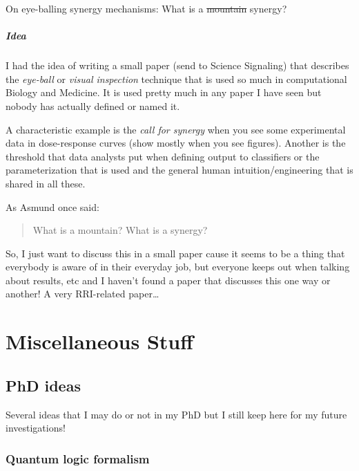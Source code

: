 \documentclass[12pt,]{book}
\begin{document}
On eye-balling synergy mechanisms: What is a \sout{mountain} synergy?

\hypertarget{idea-3}{%
\subsubsection*{Idea}\label{idea-3}}

I had the idea of writing a small paper (send to Science Signaling) that describes the \emph{eye-ball} or
\emph{visual inspection} technique that is used so much in computational Biology and
Medicine. It is used pretty much in any paper I have seen but nobody has actually
defined or named it.

A characteristic example is the \emph{call for synergy} when you see some
experimental data in dose-response curves (show mostly when you see figures). Another is the threshold that data analysts put when defining output to classifiers or the parameterization that is used and the general human intuition/engineering that is shared in all these.

As Asmund once said:

\begin{quote}
What is a mountain? What is a synergy?
\end{quote}

So, I just want to discuss this in a small paper cause it seems to be a
thing that everybody is aware of in their everyday job, but everyone keeps out
when talking about results, etc and I haven't found a paper that discusses this
one way or another!
A very RRI-related paper\ldots{}

\hypertarget{part-miscellaneous-stuff}{%
\part*{Miscellaneous Stuff}\label{part-miscellaneous-stuff}}

\hypertarget{ideas}{%
\chapter{PhD ideas}\label{ideas}}

Several ideas that I may do or not in my PhD but I still keep here for my future
investigations!

\hypertarget{quantum}{%
\section{Quantum logic formalism}\label{quantum}}
\end{document}
